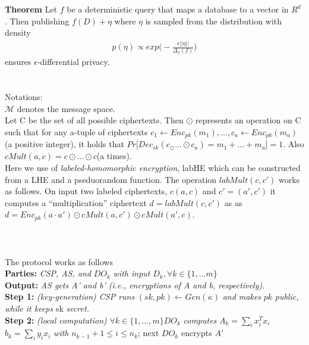 \textbf{Theorem}\cite{sensitivity} Let $f$ be a deterministic query that maps a database to a vector in $R
^d$
. Then publishing $f (D)+\eta$
where $\eta$ is sampled from the distribution with density
\begin{gather}p(\eta) \propto  exp\Big(-\frac{\epsilon||\eta||}{\Delta_2(f)}\Big)
\label{noise}
\end{gather}
ensures $\epsilon$-differential privacy.\\\\\\
Notations:
\\
$\mathcal{M}$ denotes the message space.\\
Let C be the set of all possible ciphertexts. Then $\odot$ represents an operation on C such that
for any a-tuple of ciphertexts $c_1 \leftarrow Enc_{pk}(m_1), ... , c_a \leftarrow Enc_{pk}(m_a)$ (a positive integer), it
holds that $Pr\Big[Dec_{sk}(c_ \odot ... \odot c_a) = m_1 +... + m_a\Big]  =1$. Also $cMult(a,c)=c\odot...\odot c$(a times). \\  Here we use of \textit{labeled-homomorphic encryption}, labHE which can be constructed from a LHE and a pseduorandom function. The operation $labMult(c, c')$ works as follows. On input two labeled ciphertexts, $c  (a, c)$ and $c'=(a',c')$ 
 it computes a
“multiplication” ciphertext $d  =labMult(c, c')$ as  as $ d =Enc_{pk}(a \cdot a')\odot cMult(a, c')\odot cMult(a',c)$.\\\\\\\\
The protocol works as follows
\\ \textbf{Parties:} \textit{ CSP, AS, and }$DO_k$ \textit{ with input } $D_k, \forall k \in \{1,...m\}$\\
\textbf{Output:}  \textit{ AS gets A' and b'
(i.e., encryptions of A and b, respectively).}\\
\textbf{Step 1: } \textit{ (key-generation) CSP runs  }$(sk, pk) \leftarrow Gen(\kappa) $\textit{ and makes } $pk$ \textit{ public,}\\ \textit{    while it keeps } sk \textit{ secret.}\\
\textbf{Step 2:} \textit{ (local computation) } $\forall k \in \{1,...,m\}   DO_k$
\textit{computes } $A_k=\sum_ix_i^Tx_i$  $b_k=\sum_iy_ix_i$ \textit{ with } $n_{k-1}+1 \leq i\leq n_k$; next $DO_k$ encrypts $A'$
